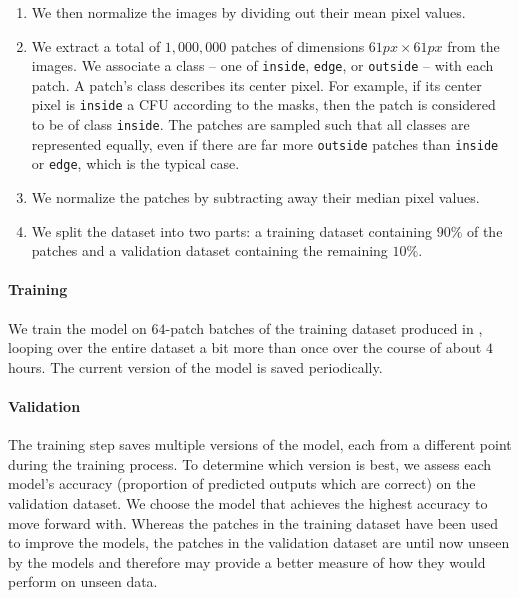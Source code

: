 \documentclass[10pt,letterpaper]{article}
\begin{document}
\begin{enumerate}
            \item
                We then normalize the images by dividing out their mean pixel values.
        
            \item
                We extract a total of $1,000,000$ patches of dimensions $61px \times 61px$ from the images. We associate a class -- one of \texttt{inside}, \texttt{edge}, or \texttt{outside} -- with each patch. A patch's class describes its center pixel. For example, if its center pixel is \texttt{inside} a CFU according to the masks, then the patch is considered to be of class \texttt{inside}. The patches are sampled such that all classes are represented equally, even if there are far more \texttt{outside} patches than \texttt{inside} or \texttt{edge}, which is the typical case.
        
            \item
                We normalize the patches by subtracting away their median pixel values.
        
            \item
                We split the dataset into two parts: a training dataset containing $90\%$ of the patches and a validation dataset containing the remaining $10\%$.
    
        \end{enumerate}

     \paragraph*{Training}
        We train the model on $64$-patch batches of the training dataset produced in , looping over the entire dataset a bit more than once over the course of about $4$ hours. The current version of the model is saved periodically.

     \paragraph*{Validation}
        The training step saves multiple versions of the model, each from a different point during the training process. To determine which version is best, we assess each model's accuracy (proportion of predicted outputs which are correct) on the validation dataset. We choose the model that achieves the highest accuracy to move forward with. Whereas the patches in the training dataset have been used to improve the models, the patches in the validation dataset are until now unseen by the models and therefore may provide a better measure of how they would perform on unseen data.
\end{document}
